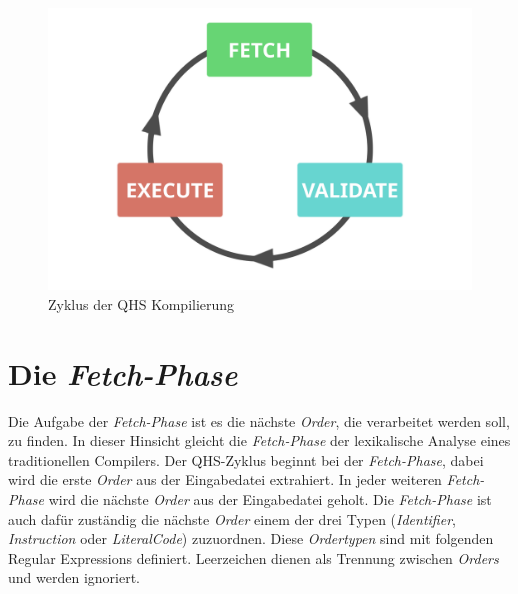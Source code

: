 \begin{figure}[h!]
    \centering
    \includegraphics[scale=0.6]{resources/images/qhs-cycle.png}
    \caption{Zyklus der QHS Kompilierung}
    \label{fig:qhs-cycle}
\end{figure}

\section{Die \textit{Fetch-Phase}} \label{sec:qhs-fetch}
Die Aufgabe der \textit{Fetch-Phase} ist es die nächste \textit{Order}, die verarbeitet werden soll, zu finden. In dieser Hinsicht gleicht die \textit{Fetch-Phase} der lexikalische Analyse eines traditionellen Compilers.
Der QHS-Zyklus beginnt bei der \textit{Fetch-Phase}, dabei wird die erste \textit{Order} aus der Eingabedatei extrahiert. In jeder weiteren \textit{Fetch-Phase} wird die nächste \textit{Order} aus der Eingabedatei geholt.
Die \textit{Fetch-Phase} ist auch dafür zuständig die nächste \textit{Order} einem der drei Typen (\textit{Identifier}, \textit{Instruction} oder \textit{LiteralCode}) zuzuordnen.
Diese \textit{Ordertypen} sind mit folgenden Regular Expressions definiert. Leerzeichen dienen als Trennung zwischen \textit{Orders} und werden ignoriert.

